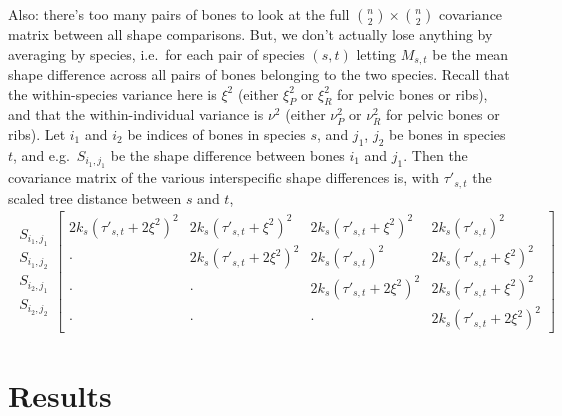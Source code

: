 \documentclass{article}
\begin{document}
Also: there's too many pairs of bones to look at the full ${n \choose 2} \times {n \choose 2}$ covariance matrix
between all shape comparisons.
But, we don't actually lose anything by averaging by species, 
i.e.\ for each pair of species $(s,t)$ letting $M_{s,t}$ be the mean shape difference across all pairs of bones belonging to the two species.
Recall that the within-species variance here is $\xi^2$ (either $\xi^2_P$ or $\xi^2_R$ for pelvic bones or ribs),
and that the within-individual variance is $\nu^2$ (either $\nu^2_P$ or $\nu^2_R$ for pelvic bones or ribs).
Let $i_1$ and $i_2$ be indices of bones in species $s$, and $j_1$, $j_2$ be bones in species $t$,
and e.g.\ $S_{i_1,j_1}$ be the shape difference between bones $i_1$ and $j_1$.
Then the covariance matrix of the various interspecific shape differences is, with $\tau'_{s,t}$ the scaled tree distance between $s$ and $t$,
\begin{align}
\begin{matrix}
S_{i_1,j_1} \\
S_{i_1,j_2} \\
S_{i_2,j_1} \\
S_{i_2,j_2} 
\end{matrix}
\begin{bmatrix}
  2 k_s ( \tau'_{s,t} + 2 \xi^2 )^2   &  
    2 k_s ( \tau'_{s,t} + \xi^2 )^2   &  
    2 k_s ( \tau'_{s,t} + \xi^2 )^2   &  
    2 k_s ( \tau'_{s,t} )^2   \\
  \cdot & 
    2 k_s ( \tau'_{s,t} + 2 \xi^2 )^2   &  
    2 k_s ( \tau'_{s,t} )^2   &  
    2 k_s ( \tau'_{s,t} + \xi^2 )^2   \\
  \cdot & 
    \cdot & 
    2 k_s ( \tau'_{s,t} + 2 \xi^2 )^2   &  
    2 k_s ( \tau'_{s,t} + \xi^2 )^2   \\
  \cdot & 
    \cdot & 
    \cdot & 
    2 k_s ( \tau'_{s,t} + 2 \xi^2 )^2   
\end{bmatrix}
\end{align}


\section{Results}
\end{document}
